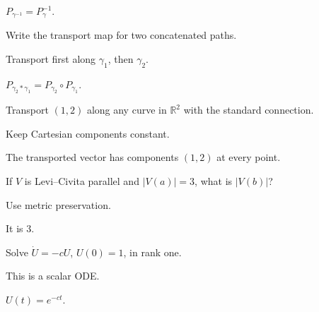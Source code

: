 \begin{solution}
\(P_{\gamma^{-1}}=P_\gamma^{-1}\).
\end{solution}

\begin{exercise}[Concatenation]\label{exr:vii24-ped-02}
Write the transport map for two concatenated paths.
\end{exercise}

\begin{hint}
Transport first along \(\gamma_1\), then \(\gamma_2\).
\end{hint}

\begin{solution}
\(P_{\gamma_2*\gamma_1}=P_{\gamma_2}\circ P_{\gamma_1}\).
\end{solution}

\begin{exercise}\label{exr:vii24-ped-03}
Transport \((1,2)\) along any curve in \(\mathbb R^2\) with the standard connection.
\end{exercise}

\begin{hint}
Keep Cartesian components constant.
\end{hint}

\begin{solution}
The transported vector has components \((1,2)\) at every point.
\end{solution}

\begin{exercise}\label{exr:vii24-ped-04}
If \(V\) is Levi--Civita parallel and \(|V(a)|=3\), what is \(|V(b)|\)?
\end{exercise}

\begin{hint}
Use metric preservation.
\end{hint}

\begin{solution}
It is \(3\).
\end{solution}

\begin{exercise}\label{exr:vii24-ped-05}
Solve \(\dot U=-cU\), \(U(0)=1\), in rank one.
\end{exercise}

\begin{hint}
This is a scalar ODE.
\end{hint}

\begin{solution}
\(U(t)=e^{-ct}\).
\end{solution}

